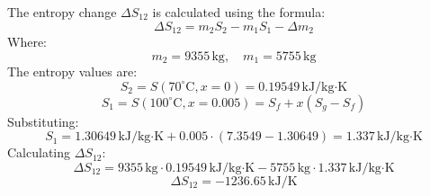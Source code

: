 The entropy change \( \Delta S_{12} \) is calculated using the formula:  
\[
\Delta S_{12} = m_2 S_2 - m_1 S_1 - \Delta m_2
\]  
Where:  
\[
m_2 = 9355 \, \text{kg}, \quad m_1 = 5755 \, \text{kg}
\]  
The entropy values are:  
\[
S_2 = S(70^\circ\text{C}, x=0) = 0.19549 \, \text{kJ/kg·K}
\]  
\[
S_1 = S(100^\circ\text{C}, x=0.005) = S_f + x(S_g - S_f)
\]  
Substituting:  
\[
S_1 = 1.30649 \, \text{kJ/kg·K} + 0.005 \cdot (7.3549 - 1.30649) = 1.337 \, \text{kJ/kg·K}
\]  
Calculating \( \Delta S_{12} \):  
\[
\Delta S_{12} = 9355 \, \text{kg} \cdot 0.19549 \, \text{kJ/kg·K} - 5755 \, \text{kg} \cdot 1.337 \, \text{kJ/kg·K}
\]  
\[
\Delta S_{12} = -1236.65 \, \text{kJ/K}
\]